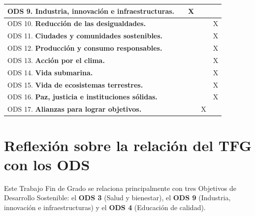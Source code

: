 \begin{tabular}{|l|c|c|c|c|}
	ODS 9.  \textbf{Industria, innovaci\'on e infraestructuras.} &               & X              &               &                  \\ \hline
	ODS 10. \textbf{Reducci\'on de las desigualdades.}           &               &                &               & X                \\ \hline
	ODS 11. \textbf{Ciudades y comunidades sostenibles.}         &               &                &               & X                \\ \hline
	ODS 12. \textbf{Producci\'on y consumo responsables.}        &               &                &               & X                \\ \hline
	ODS 13. \textbf{Acci\'on por el clima.}                      &               &                &               & X                \\ \hline
	ODS 14. \textbf{Vida submarina.}                             &               &                &               & X                \\ \hline
	ODS 15. \textbf{Vida de ecosistemas terrestres.}             &               &                &               & X                \\ \hline
	ODS 16. \textbf{Paz, justicia e instituciones s\'olidas.}    &               &                &               & X                \\ \hline
	ODS 17. \textbf{Alianzas para lograr objetivos.}             &               &                & X             &                  \\ \hline
\end{tabular}
\newpage
\section*{Reflexión sobre la relación del TFG con los ODS}

Este Trabajo Fin de Grado se relaciona principalmente con tres Objetivos de Desarrollo Sostenible: el \textbf{ODS 3} (Salud y bienestar), el \textbf{ODS 9} (Industria, innovación e infraestructuras) y el \textbf{ODS 4} (Educación de calidad).

